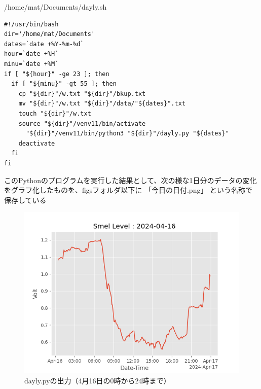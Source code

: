 \documentclass[12pt,a4paper,uplatex]{jsarticle}
\begin{document}
\begin{itembox}[l]{/home/mat/Documents/dayly.sh}
	\begin{verbatim}
#!/usr/bin/bash
dir='/home/mat/Documents'
dates=`date +%Y-%m-%d`
hour=`date +%H`
minu=`date +%M`
if [ "${hour}" -ge 23 ]; then
  if [ "${minu}" -gt 55 ]; then
    cp "${dir}"/w.txt "${dir}"/bkup.txt
    mv "${dir}"/w.txt "${dir}"/data/"${dates}".txt
    touch "${dir}"/w.txt
    source "${dir}"/venv11/bin/activate
      "${dir}"/venv11/bin/python3 "${dir}"/dayly.py "${dates}"
    deactivate
  fi
fi
	\end{verbatim}
\end{itembox}

\newpage

このPythonのプログラムを実行した結果として、次の様な1日分のデータの変化をグラフ化したものを、figsフォルダ以下に 「今日の日付.png」 という名称で保存している

\begin{figure}[htbp]
	\begin{minipage}[b]{1.0\linewidth}
		\centering
		\includegraphics[keepaspectratio, scale=0.8]{figs/png/2024-04-16.png}
		\caption{dayly.pyの出力（4月16日の0時から24時まで）}
	\end{minipage}
\end{figure}
\end{document}
